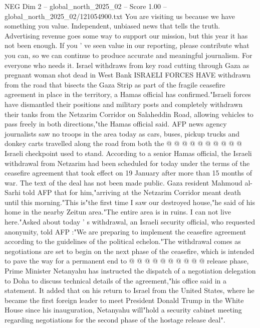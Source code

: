 \begin{textsample}{NEG Dim 2 – global\_north\_2025\_02 – Score 1.00 – global\_north\_2025\_02/121054900.txt}  \label{ex:f2_neg_013}
You are visiting us because we have something you value.
Independent, unbiased news that tells the truth.
Advertising revenue goes some way to support our mission, but this year it has not been enough.
If you ' ve seen value in our reporting, please contribute what you can, so we can continue to produce accurate and meaningful journalism.
For everyone who needs it.
Israel withdraws from key road cutting through Gaza as pregnant woman shot dead in West Bank ISRAELI FORCES HAVE withdrawn from the road that bisects the Gaza Strip as part of the fragile ceasefire agreement in place in the territory, a Hamas official has confirmed."Israeli forces have dismantled their positions and military posts and completely withdrawn their tanks from the Netzarim Corridor on Salaheddin Road, allowing vehicles to pass freely in both directions,"the Hamas official said.
AFP news agency journalists saw no troops in the area today as cars, buses, pickup trucks and donkey carts travelled along the road from both the @ @ @ @ @ @ @ @ @ @ Israeli checkpoint used to stand.
According to a senior Hamas official, the Israeli withdrawal from Netzarim had been scheduled for today under the terms of the ceasefire agreement that took effect on 19 January after more than 15 months of war.
The text of the deal has not been made public.
Gaza resident Mahmoud al-Sarhi told AFP that for him,"arriving at the Netzarim Corridor meant death until this morning."This is"the first time I saw our destroyed house,"he said of his home in the nearby Zeitun area."The entire area is in ruins.
I can not live here."Asked about today ' s withdrawal, an Israeli security official, who requested anonymity, told AFP :"We are preparing to implement the ceasefire agreement according to the guidelines of the political echelon."The withdrawal comes as negotiations are set to begin on the next phase of the ceasefire, which is intended to pave the way for a permanent end to @ @ @ @ @ @ @ @ @ @ release phase, Prime Minister Netanyahu has instructed the dispatch of a negotiation delegation to Doha to discuss technical details of the agreement,"his office said in a statement.
It added that on his return to Israel from the United States, where he became the first foreign leader to meet President Donald Trump in the White House since his inauguration, Netanyahu will"hold a security cabinet meeting regarding negotiations for the second phase of the hostage release deal".

\end{textsample}
